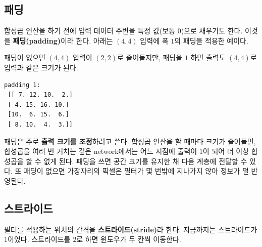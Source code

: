 \documentclass[11pt,a4paper]{article}
\begin{document}
\subsection{패딩}\label{sec:padding}

합성곱 연산을 하기 전에 입력 데이터 주변을 특정 값(보통 $0$)으로 채우기도 한다.
이것을 \textbf{패딩(padding)}이라 한다. 아래는 $(4,4)$ 입력에 폭 $1$의 패딩을 적용한 예이다.

\begin{center}
\end{center}

패딩이 없으면 $(4,4)$ 입력이 $(2,2)$로 줄어들지만, 패딩을 $1$ 하면 출력도 $(4,4)$로 입력과 같은 크기가 된다.
\begin{lstlisting}[language={},numbers=none]
padding 1:
 [[ 7. 12. 10.  2.]
 [ 4. 15. 16. 10.]
 [10.  6. 15.  6.]
 [ 8. 10.  4.  3.]]
\end{lstlisting}
패딩은 주로 \textbf{출력 크기를 조정}하려고 쓴다.
합성곱 연산을 할 때마다 크기가 줄어들면, 합성곱을 여러 번 거치는 깊은 network에서는 어느 시점에 출력이 $1$이 되어
더 이상 합성곱을 할 수 없게 된다. 패딩을 쓰면 공간 크기를 유지한 채 다음 계층에 전달할 수 있다.
또 패딩이 없으면 가장자리의 픽셀은 필터가 몇 번밖에 지나가지 않아 정보가 덜 반영된다.

\subsection{스트라이드}\label{sec:stride}

필터를 적용하는 위치의 간격을 \textbf{스트라이드(stride)}라 한다. 지금까지는 스트라이드가 $1$이었다.
스트라이드를 $2$로 하면 윈도우가 두 칸씩 이동한다.
\end{document}
